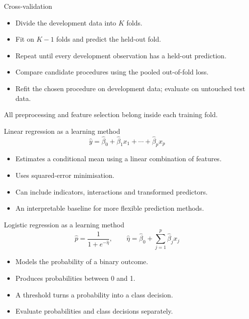 \begin{frame}{Cross-validation}
\begin{itemize}
\item Divide the development data into $K$ folds.
\item Fit on $K-1$ folds and predict the held-out fold.
\item Repeat until every development observation has a held-out prediction.
\item Compare candidate procedures using the pooled out-of-fold loss.
\item Refit the chosen procedure on development data; evaluate on untouched test data.
\end{itemize}All preprocessing and feature selection belong inside each training fold.
\end{frame}

\begin{frame}{Linear regression as a learning method}
\[\hat y=\hat\beta_0+\hat\beta_1x_1+\cdots+\hat\beta_px_p\]\begin{itemize}
\item Estimates a conditional mean using a linear combination of features.
\item Uses squared-error minimisation.
\item Can include indicators, interactions and transformed predictors.
\item An interpretable baseline for more flexible prediction methods.
\end{itemize}
\end{frame}

\begin{frame}{Logistic regression as a learning method}
\[\hat p=\frac{1}{1+e^{-\hat\eta}},\qquad\hat\eta=\hat\beta_0+\sum_{j=1}^p\hat\beta_jx_j\]\begin{itemize}
\item Models the probability of a binary outcome.
\item Produces probabilities between 0 and 1.
\item A threshold turns a probability into a class decision.
\item Evaluate probabilities and class decisions separately.
\end{itemize}
\end{frame}

